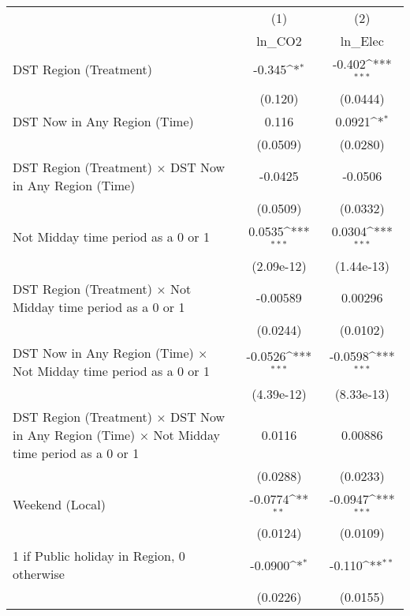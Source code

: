{
\def\sym#1{\ifmmode^{#1}\else\(^{#1}\)\fi}
\begin{tabular}{l*{2}{c}}
\hline\hline
                    &\multicolumn{1}{c}{(1)}&\multicolumn{1}{c}{(2)}\\
                    &\multicolumn{1}{c}{ln\_CO2}&\multicolumn{1}{c}{ln\_Elec}\\
\hline
DST Region (Treatment)&      -0.345\sym{*}  &      -0.402\sym{***}\\
                    &     (0.120)         &    (0.0444)         \\
[1em]
DST Now in Any Region (Time)&       0.116         &      0.0921\sym{*}  \\
                    &    (0.0509)         &    (0.0280)         \\
[1em]
DST Region (Treatment) $\times$ DST Now in Any Region (Time)&     -0.0425         &     -0.0506         \\
                    &    (0.0509)         &    (0.0332)         \\
[1em]
Not Midday time period as a 0 or 1&      0.0535\sym{***}&      0.0304\sym{***}\\
                    &  (2.09e-12)         &  (1.44e-13)         \\
[1em]
DST Region (Treatment) $\times$ Not Midday time period as a 0 or 1&    -0.00589         &     0.00296         \\
                    &    (0.0244)         &    (0.0102)         \\
[1em]
DST Now in Any Region (Time) $\times$ Not Midday time period as a 0 or 1&     -0.0526\sym{***}&     -0.0598\sym{***}\\
                    &  (4.39e-12)         &  (8.33e-13)         \\
[1em]
DST Region (Treatment) $\times$ DST Now in Any Region (Time) $\times$ Not Midday time period as a 0 or 1&      0.0116         &     0.00886         \\
                    &    (0.0288)         &    (0.0233)         \\
[1em]
Weekend (Local)     &     -0.0774\sym{**} &     -0.0947\sym{***}\\
                    &    (0.0124)         &    (0.0109)         \\
[1em]
1 if Public holiday in Region, 0 otherwise&     -0.0900\sym{*}  &      -0.110\sym{**} \\
                    &    (0.0226)         &    (0.0155)         \\

\end{tabular}}
